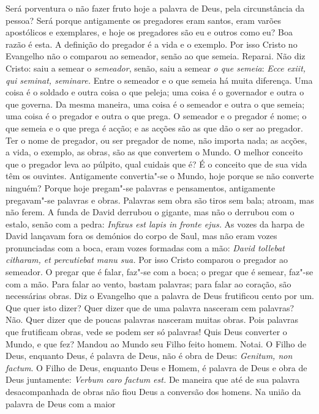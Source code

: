 Será porventura o não fazer fruto hoje a palavra de Deus, pela
circunstância da pessoa? Será porque antigamente os pregadores eram
santos, eram varões apostólicos e exemplares, e hoje os pregadores são
eu e outros como eu? Boa razão é esta. A definição do pregador é a
vida e o exemplo. Por isso Cristo no Evangelho não o comparou ao
semeador, senão ao que semeia. Reparai. Não diz Cristo: saiu a semear o
\emph{semeador}, senão, saiu a semear \emph{o que semeia}: \emph{Ecce
exiit, qui seminat, seminare.} Entre o semeador e o que semeia há muita
diferença. Uma coisa é o soldado e outra coisa o que peleja; uma coisa é
o governador e outra o que governa. Da mesma maneira, uma coisa é o
semeador e outra o que semeia; uma coisa é o pregador e outra o que
prega. O semeador e o pregador é nome; o que semeia e o que prega é
acção; e as acções são as que dão o ser ao pregador. Ter o nome de
pregador, ou ser pregador de nome, não importa nada; as acções, a vida,
o exemplo, as obras, são as que convertem o Mundo. O melhor conceito
que o pregador leva ao púlpito, qual cuidais que é? É o conceito que
de sua vida têm os ouvintes.
Antigamente convertia"-se o Mundo, hoje porque se não converte ninguém? Porque hoje pregam"-se palavras e pensamentos, antigamente
pregavam"-se palavras e obras. Palavras sem obra são tiros sem bala;
atroam, mas não ferem. A funda de David derrubou o gigante, mas não o
derrubou com o estalo, senão com a pedra: \emph{Infixus est lapis in
fronte ejus.} As vozes da harpa de David lançavam
fora os demónios do corpo de Saul, mas não eram vozes pronunciadas com a
boca, eram vozes formadas com a mão: \emph{David tollebat citharam, et
percutiebat manu sua.} Por isso Cristo comparou o
pregador ao semeador. O pregar que é falar, faz"-se com a boca; o pregar
que é semear, faz"-se com a mão. Para falar
ao vento, bastam palavras; para falar ao coração, são necessárias obras.
Diz o Evangelho que a palavra de Deus frutificou cento por um. Que quer
isto dizer? Quer dizer que de uma palavra nasceram cem palavras? Não.
Quer dizer que de poucas palavras nasceram muitas obras. Pois palavras
que frutificam obras, vede se podem ser só palavras! Quis Deus converter
o Mundo, e que fez? Mandou ao Mundo seu Filho feito homem. Notai. O
Filho de Deus, enquanto Deus, é palavra de Deus, não é obra de Deus:
\emph{Genitum, non factum}. O Filho de Deus, enquanto Deus e Homem, é
palavra de Deus e obra de Deus juntamente: \emph{Verbum caro factum
est.} De maneira que até de sua palavra desacompanhada de obras não fiou
Deus a conversão dos homens. Na união da palavra de Deus com a maior
